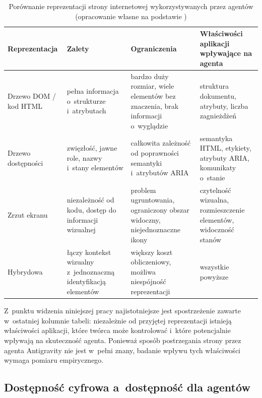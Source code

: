 \begin{table}[H]
\centering
\caption{Porównanie reprezentacji strony internetowej wykorzystywanych przez agentów (opracowanie własne na podstawie \citep{zhou2024webarena, zheng2024seeact, chezelles2025browsergym})}
\label{tab:reprezentacje}
\footnotesize
\begin{tabularx}{\textwidth}{>{\raggedright\arraybackslash}p{2.4cm}>{\raggedright\arraybackslash}X>{\raggedright\arraybackslash}X>{\raggedright\arraybackslash}X}
\toprule
\textbf{Reprezentacja} & \textbf{Zalety} & \textbf{Ograniczenia} & \textbf{Właściwości aplikacji wpływające na agenta} \\
\midrule
Drzewo DOM / kod HTML & pełna informacja o~strukturze i~atrybutach & bardzo duży rozmiar, wiele elementów bez znaczenia, brak informacji o~wyglądzie & struktura dokumentu, atrybuty, liczba zagnieżdżeń \\
\addlinespace
Drzewo dostępności & zwięzłość, jawne role, nazwy i~stany elementów & całkowita zależność od poprawności semantyki i~atrybutów ARIA & semantyka HTML, etykiety, atrybuty ARIA, komunikaty o~stanie \\
\addlinespace
Zrzut ekranu & niezależność od kodu, dostęp do informacji wizualnej & problem ugruntowania, ograniczony obszar widoczny, niejednoznaczne ikony & czytelność wizualna, rozmieszczenie elementów, widoczność stanów \\
\addlinespace
Hybrydowa & łączy kontekst wizualny z~jednoznaczną identyfikacją elementów & większy koszt obliczeniowy, możliwa niespójność reprezentacji & wszystkie powyższe \\
\bottomrule
\end{tabularx}
\end{table}

Z~punktu widzenia niniejszej pracy najistotniejsze jest spostrzeżenie zawarte w~ostatniej kolumnie tabeli: niezależnie od przyjętej reprezentacji istnieją właściwości aplikacji, które twórca może kontrolować i~które potencjalnie wpływają na skuteczność agenta. Ponieważ sposób postrzegania strony przez agenta Antigravity nie jest w~pełni znany, badanie wpływu tych właściwości wymaga pomiaru empirycznego.

\subsection{Dostępność cyfrowa a~dostępność dla agentów}
\label{sec:dostepnosc}

